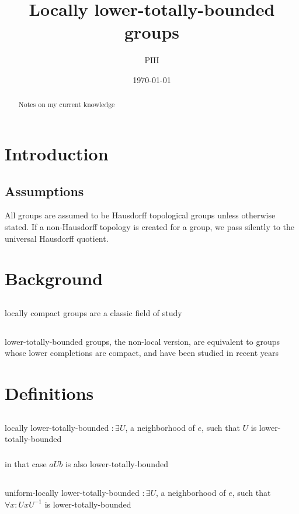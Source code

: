 \documentclass[a4paper]{article}
\title{Locally lower-totally-bounded groups}
\author{PIH}
\date{\today}
\newcommand{\inv }{^{-1}}
\begin{document}
\maketitle

\begin{abstract}
Notes on my current knowledge %
\end{abstract}

\section*{Introduction}
\subsection*{Assumptions}
All groups are assumed to be Hausdorff topological groups unless otherwise stated. If a non-Hausdorff topology is created for a group, we pass silently to the universal Hausdorff quotient.

\section{Background}
\subsection{} locally compact groups are a classic field of study
\subsection{} lower-totally-bounded groups, the non-local version, are equivalent to groups whose lower completions are compact, and have been studied in recent years
\section{Definitions}
\subsection{} locally lower-totally-bounded $:\exists U$, a neighborhood of $e$, such that $U$ is lower-totally-bounded
\subsubsection{} in that case $aUb$ is also lower-totally-bounded
\subsection{} uniform-locally lower-totally-bounded $:\exists U$, a neighborhood of $e$, such that $\forall x:UxU\inv $ is lower-totally-bounded
\end{document}
